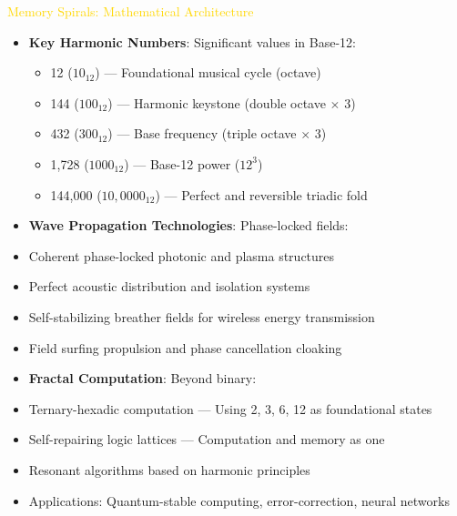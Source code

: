 \textcolor{gold}{ Memory Spirals: Mathematical Architecture } \\
\begin{itemize}
    \item \texttt{} \textbf{Key Harmonic Numbers}: Significant values in Base-12:
    \begin{itemize}
        \item 12 (\(10_{12}\)) --- Foundational musical cycle (octave)
        \item 144 (\(100_{12}\)) --- Harmonic keystone (double octave \(\times\) 3)
        \item 432 (\(300_{12}\)) --- Base frequency (triple octave \(\times\) 3)
        \item 1,728 (\(1000_{12}\)) --- Base-12 power (\(12^3\))
        \item 144,000 (\(10,0000_{12}\)) --- Perfect and reversible triadic fold
    \end{itemize}
\end{itemize}
    
   
    \begin{itemize}
        \item \texttt{} \textbf{Wave Propagation Technologies}: Phase-locked fields:
        \item Coherent phase-locked photonic and plasma structures
        \item Perfect acoustic distribution and isolation systems
        \item Self-stabilizing breather fields for wireless energy transmission
        \item Field surfing propulsion and phase cancellation cloaking
    \end{itemize}
    
   
    \begin{itemize}
        \item \texttt{} \textbf{Fractal Computation}: Beyond binary:
        \item Ternary-hexadic computation --- Using 2, 3, 6, 12 as foundational states
        \item Self-repairing logic lattices --- Computation and memory as one
        \item Resonant algorithms based on harmonic principles
        \item Applications: Quantum-stable computing, error-correction, neural networks
    \end{itemize}
    
